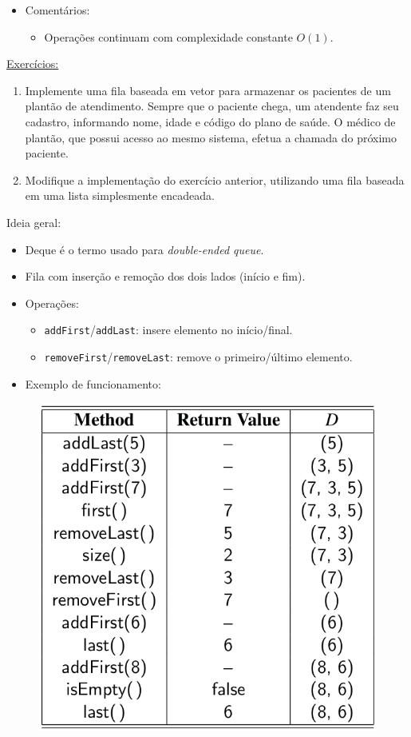 \medskip

\begin{itemize}
	\color{redtext}
	\item Comentários:
	\begin{itemize}
		\item Operações continuam com complexidade constante $O(1)$.
	\end{itemize}
\end{itemize}

\underline{Exercícios:}
\begin{enumerate}
	\item Implemente uma fila baseada em vetor para armazenar os pacientes de um plantão de atendimento. Sempre que o paciente chega, um atendente faz seu cadastro, informando nome, idade e código do plano de saúde. O médico de plantão, que possui acesso ao mesmo sistema, efetua a chamada do próximo paciente.
	
	\item Modifique a implementação do exercício anterior, utilizando uma fila baseada em uma lista simplesmente encadeada.
\end{enumerate}

\medskip


Ideia geral:
\begin{itemize}
	\item Deque é o termo usado para \textit{double-ended queue}.
	\item Fila com inserção e remoção dos dois lados (início e fim).
	\item Operações:
	\begin{itemize}
		\item \texttt{addFirst}/\texttt{addLast}: insere elemento no início/final.
		\item \texttt{removeFirst}/\texttt{removeLast}: remove o primeiro/último elemento.
	\end{itemize}
\end{itemize}

\begin{itemize}
	\item Exemplo de funcionamento:
\end{itemize}

\begin{figure}[H]
	\centering
	\includegraphics[width=0.38\linewidth]{img/example-6-5}
\end{figure}

